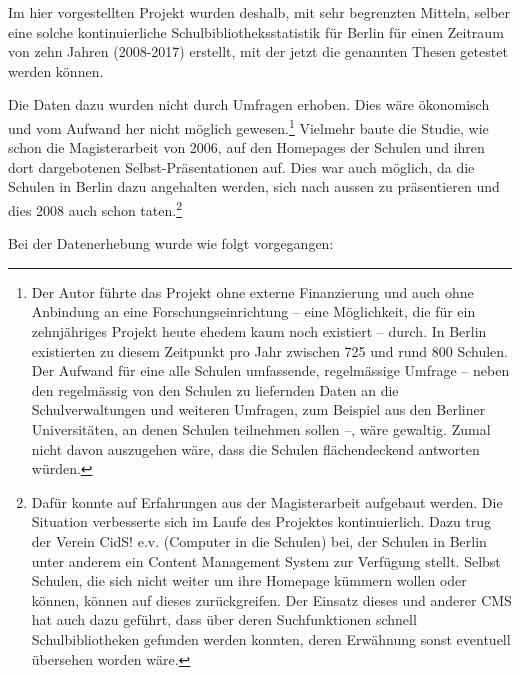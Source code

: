 \documentclass[a4paper,
fontsize=11pt,
oneside,
numbers=noperiodatend,
parskip=half-,
bibliography=totoc,
final
]{scrartcl}
\begin{document}
Im hier vorgestellten Projekt wurden deshalb, mit sehr begrenzten
Mitteln, selber eine solche kontinuierliche Schulbibliotheksstatistik
für Berlin für einen Zeitraum von zehn Jahren (2008-2017) erstellt, mit
der jetzt die genannten Thesen getestet werden können.

Die Daten dazu wurden nicht durch Umfragen erhoben. Dies wäre ökonomisch
und vom Aufwand her nicht möglich gewesen.\footnote{Der Autor führte das
  Projekt ohne externe Finanzierung und auch ohne Anbindung an eine
  Forschungseinrichtung -- eine Möglichkeit, die für ein zehnjähriges
  Projekt heute ehedem kaum noch existiert -- durch. In Berlin
  existierten zu diesem Zeitpunkt pro Jahr zwischen 725 und rund 800
  Schulen. Der Aufwand für eine alle Schulen umfassende, regelmässige
  Umfrage -- neben den regelmässig von den Schulen zu liefernden Daten
  an die Schulverwaltungen und weiteren Umfragen, zum Beispiel aus den
  Berliner Universitäten, an denen Schulen teilnehmen sollen --, wäre
  gewaltig. Zumal nicht davon auszugehen wäre, dass die Schulen
  flächendeckend antworten würden.} Vielmehr baute die Studie, wie schon
die Magisterarbeit von 2006, auf den Homepages der Schulen und ihren
dort dargebotenen Selbst-Präsentationen auf. Dies war auch möglich, da
die Schulen in Berlin dazu angehalten werden, sich nach aussen zu
präsentieren und dies 2008 auch schon taten.\footnote{Dafür konnte auf
  Erfahrungen aus der Magisterarbeit aufgebaut werden. Die Situation
  verbesserte sich im Laufe des Projektes kontinuierlich. Dazu trug der
  Verein CidS! e.v. (Computer in die Schulen) bei, der Schulen in Berlin
  unter anderem ein Content Management System zur Verfügung stellt.
  Selbst Schulen, die sich nicht weiter um ihre Homepage kümmern wollen
  oder können, können auf dieses zurückgreifen. Der Einsatz dieses und
  anderer CMS hat auch dazu geführt, dass über deren Suchfunktionen
  schnell Schulbibliotheken gefunden werden konnten, deren Erwähnung
  sonst eventuell übersehen worden wäre.}

Bei der Datenerhebung wurde wie folgt vorgegangen:
\end{document}
